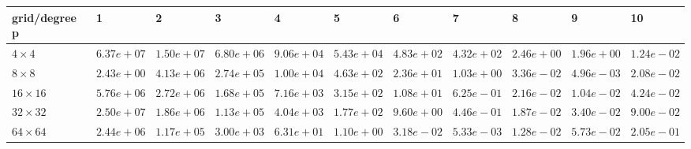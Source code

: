 \begin{tabular}{lllllllllll}
\hline
 grid/degree p   & 1          & 2          & 3          & 4          & 5          & 6          & 7          & 8          & 9          & 10         \\
\hline
 $4 \times 4$    & $6.37e+07$ & $1.50e+07$ & $6.80e+06$ & $9.06e+04$ & $5.43e+04$ & $4.83e+02$ & $4.32e+02$ & $2.46e+00$ & $1.96e+00$ & $1.24e-02$ \\
 $8 \times 8$    & $2.43e+00$ & $4.13e+06$ & $2.74e+05$ & $1.00e+04$ & $4.63e+02$ & $2.36e+01$ & $1.03e+00$ & $3.36e-02$ & $4.96e-03$ & $2.08e-02$ \\
 $16 \times 16$  & $5.76e+06$ & $2.72e+06$ & $1.68e+05$ & $7.16e+03$ & $3.15e+02$ & $1.08e+01$ & $6.25e-01$ & $2.16e-02$ & $1.04e-02$ & $4.24e-02$ \\
 $32 \times 32$  & $2.50e+07$ & $1.86e+06$ & $1.13e+05$ & $4.04e+03$ & $1.77e+02$ & $9.60e+00$ & $4.46e-01$ & $1.87e-02$ & $3.40e-02$ & $9.00e-02$ \\
 $64 \times 64$  & $2.44e+06$ & $1.17e+05$ & $3.00e+03$ & $6.31e+01$ & $1.10e+00$ & $3.18e-02$ & $5.33e-03$ & $1.28e-02$ & $5.73e-02$ & $2.05e-01$ \\
\hline
\end{tabular}